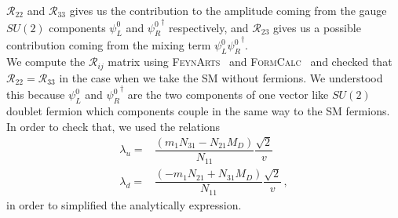 %
$\mathcal{R}_{22}$ and $\mathcal{R}_{33}$ gives us the contribution to the amplitude coming from the gauge $SU(2)$ components $\psi_L^0$ and ${\psi_R^0}^{\dagger}$ respectively, and $\mathcal{R}_{23}$ gives us a possible contribution coming from the mixing term $\psi_L^0{\psi_R^0}^{\dagger}$.
\\
We compute the $\mathcal{R}_{ij}$ matrix  using \textsc{FeynArts}~\cite{Hahn:2000kx} and \textsc{FormCalc}~\cite{Hahn:1998yk} and checked that $\mathcal{R}_{22}=\mathcal{R}_{33}$  in the case when we take the SM without fermions. We understood this because $\psi_L^0$ and ${\psi_R^0}^{\dagger}$ are the two components of one vector like $SU(2)$ doublet fermion which components couple in the same way to the SM fermions. In order to check that, we used the relations 
\begin{align}
\lambda_u =& \dfrac{(m_1N_{31} - N_{21}M_D)}{N_{11}}\dfrac{\sqrt{2}}{v} \nonumber\\ 
\lambda_d =& \dfrac{(-m_1N_{21} + N_{31}M_D)}{N_{11}}\dfrac{\sqrt{2}}{v}\,,
\end{align}
in order to simplified the analytically expression.









